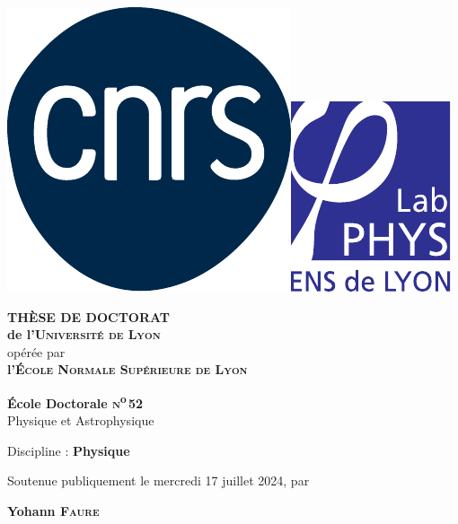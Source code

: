 
\begin{titlepage}

\includegraphics[height=0.2\textwidth]{../logos/logocnrs.pdf}\hfill\includegraphics[height=0.2\textwidth]{../logos/logolabo.pdf}

 
	\begin{center}
		
		\vspace{10pt}
		
		{\LARGE\textbf{TH\`ESE DE DOCTORAT} \\
		\vspace{1pt}
		\Large\textbf{de l'\textsc{Université de Lyon}} \\
		\vspace{.08cm}
		\large{opérée par}\\
		\vspace{.1cm}
		\Large\textbf{l'\textsc{\'Ecole Normale Supérieure de Lyon}}
		}
		
		
		\vspace{35pt}
		
		{\large \textbf{\'Ecole Doctorale \textsc{n}\textsuperscript{o}\,52}\\
		{\large{Physique et Astrophysique}}}
		
		\vspace{20pt}
		
		{\large Discipline : \textbf{Physique}}
		
		\vspace{30pt}
		
		Soutenue publiquement le mercredi 17 juillet 2024, par\\
		
		\vspace{15pt}
		
		{\LARGE\textbf{Yohann \textsc{Faure}}}\\
	\end{center}
	

\end{titlepage}
